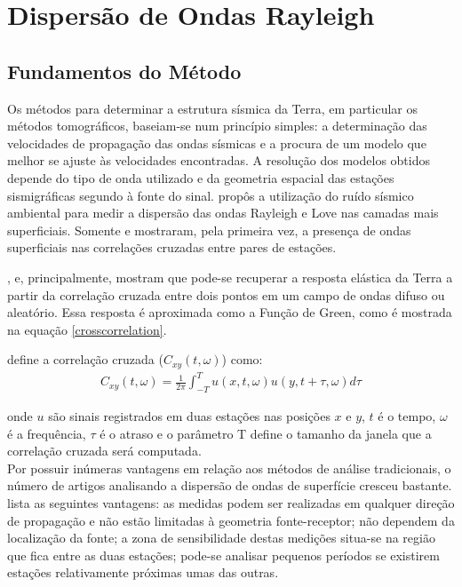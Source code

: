 \chapter{Dispersão de Ondas Rayleigh}

\section{Fundamentos do Método}

Os métodos para determinar a estrutura sísmica da Terra, em particular os métodos tomográficos, baseiam-se num princípio simples: a determinação das velocidades de propagação das ondas sísmicas e a procura de um modelo que melhor se ajuste às velocidades encontradas. A resolução dos modelos obtidos depende do tipo de onda utilizado e da geometria espacial das estações sismigráficas segundo à fonte do sinal. \cite{aki_space_1957} propôs a utilização do ruído sísmico ambiental para medir a dispersão das ondas Rayleigh e Love nas camadas mais superficiais. Somente \cite{campillo_long-range_2003}  e \cite{shapiro_emergence_2004} mostraram, pela primeira vez, a  presença de ondas superficiais nas correlações cruzadas entre pares de estações.

\cite{campillo_long-range_2003}, \cite{shapiro_emergence_2004} e, principalmente, \cite{wapenaar_retrieving_2004} mostram que pode-se recuperar a resposta elástica da Terra a partir da correlação cruzada entre dois pontos em  um campo de ondas difuso ou aleatório. Essa resposta é aproximada como a Função de Green, como é mostrada na equação \ref{crosscorrelation}. 

\cite{boschi_measuring_2013} define a correlação cruzada ($C_{xy}(t,\omega)$) como: 
\begin{eqnarray}
\label{crosscorrelation}
C_{xy}(t,\omega) = \frac{1}{2\pi}\int_{-T}^{T}u(x,t,\omega)u(y,t+\tau,\omega) d\tau
\end{eqnarray}

onde $u$ são sinais registrados em duas estações nas posições $x$ e $y$, $t$ é o tempo, $\omega$ é a frequência, $\tau$ é o atraso e o parâmetro T define o tamanho da janela que a correlação cruzada será computada.
\\

Por possuir inúmeras vantagens em relação aos métodos de análise tradicionais, o número de artigos analisando a dispersão de ondas de superfície cresceu bastante. \cite{shapiro_emergence_2004} lista as seguintes vantagens: as medidas podem ser realizadas em qualquer direção de propagação e não estão limitadas à geometria fonte-receptor; não dependem da localização da fonte; a zona de sensibilidade destas medições situa-se na região que fica entre as duas estações; pode-se analisar pequenos períodos se existirem estações relativamente próximas umas das outras.

